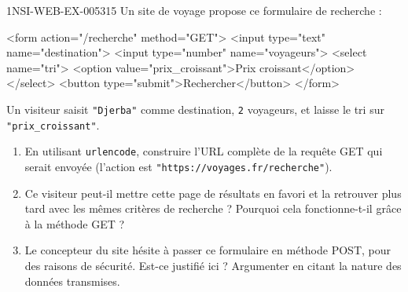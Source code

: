 \begin{exercice}{1NSI-WEB-EX-005}{3}{15}
Un site de voyage propose ce formulaire de recherche :
\begin{console}
<form action="/recherche" method="GET">
    <input type="text" name="destination">
    <input type="number" name="voyageurs">
    <select name="tri">
        <option value="prix_croissant">Prix croissant</option>
    </select>
    <button type="submit">Rechercher</button>
</form>
\end{console}
Un visiteur saisit \lstinline{"Djerba"} comme destination, \lstinline{2} voyageurs, et
laisse le tri sur \lstinline{"prix_croissant"}.
\begin{enumerate}
  \item En utilisant \lstinline{urlencode}, construire l'URL complète de la requête GET qui serait envoyée (l'action est \lstinline{"https://voyages.fr/recherche"}).
  \item Ce visiteur peut-il mettre cette page de résultats en favori et la retrouver plus tard avec les mêmes critères de recherche ? Pourquoi cela fonctionne-t-il grâce à la méthode GET ?
  \item Le concepteur du site hésite à passer ce formulaire en méthode POST, pour des raisons de sécurité. Est-ce justifié ici ? Argumenter en citant la nature des données transmises.
\end{enumerate}
\end{exercice}
